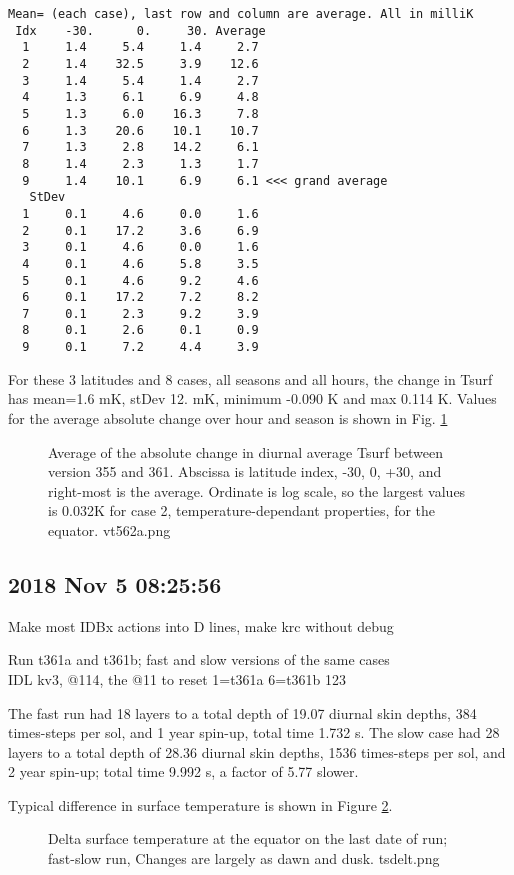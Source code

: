 \documentclass{article}
\begin{document}
\begin{verbatim}
Mean= (each case), last row and column are average. All in milliK 
 Idx    -30.      0.     30. Average
  1     1.4     5.4     1.4     2.7
  2     1.4    32.5     3.9    12.6
  3     1.4     5.4     1.4     2.7
  4     1.3     6.1     6.9     4.8
  5     1.3     6.0    16.3     7.8
  6     1.3    20.6    10.1    10.7
  7     1.3     2.8    14.2     6.1
  8     1.4     2.3     1.3     1.7
  9     1.4    10.1     6.9     6.1 <<< grand average
   StDev
  1     0.1     4.6     0.0     1.6
  2     0.1    17.2     3.6     6.9
  3     0.1     4.6     0.0     1.6
  4     0.1     4.6     5.8     3.5
  5     0.1     4.6     9.2     4.6
  6     0.1    17.2     7.2     8.2
  7     0.1     2.3     9.2     3.9
  8     0.1     2.6     0.1     0.9
  9     0.1     7.2     4.4     3.9
\end{verbatim} 

  For these 3 latitudes and 8 cases, all seasons and all hours, the change in
  Tsurf has mean=1.6 mK, stDev 12. mK, minimum -0.090 K and max 0.114 K. Values
  for the average absolute change over hour and season is shown in
  Fig. \ref{vt562a}

\begin{figure}[!ht] 
\caption[Delta Diurnal Average]{Average of the absolute change in diurnal
  average Tsurf between version 355 and 361. Abscissa is latitude index, -30, 0,
  +30, and right-most is the average. Ordinate is log scale, so the largest
  values is 0.032K for case 2, temperature-dependant properties, for the equator.
\label{vt562a}  vt562a.png }
\end{figure} 

\subsection{2018 Nov 5 08:25:56} %
Make most IDBx actions into D lines, make krc without debug

Run t361a and t361b; fast and slow versions of the same cases
\\ IDL kv3, @114, the @11 to reset 1=t361a  6=t361b
 123  

The fast run had 18 layers to a total depth of 19.07 diurnal skin depths, 384 times-steps per sol, and 1 year spin-up, total time 1.732 s. The slow case had  28 layers to a total depth of 28.36 diurnal skin depths, 1536 times-steps per sol, and 2 year spin-up; total time 9.992 s, a factor of 5.77 slower.

Typical difference in surface temperature is shown in Figure \ref{tsdelt}.
\begin{figure}[!ht] 
\caption[Delta Tsurf,fast-slow ]{Delta surface temperature at the equator on the last date of run; fast-slow run, Changes are largely as dawn and dusk.
\label{tsdelt} tsdelt.png }
\end{figure} 
\end{document}
